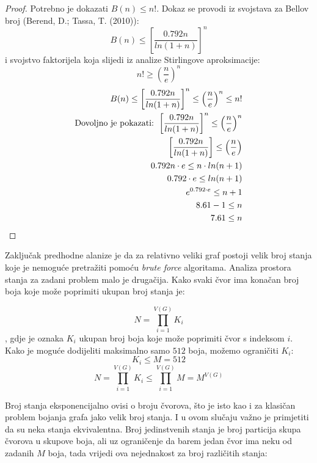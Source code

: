 \documentclass[times, utf8, diplomski, numeric]{fer}
\begin{document}
\begin{proof}
	Potrebno je dokazati $B(n) \le n!$. Dokaz se provodi iz svojstava za Bellov broj (Berend, D.; Tassa, T. (2010)): 
	\[ B(n) \le \left [ \frac{0.792 n}{ln(1+n)} \right ]^n \] 
	i svojstvo faktorijela koja slijedi iz analize Stirlingove aproksimacije: \[ n!\ge \left ( \frac{n}{e} \right )^n \]
	\begin{align}
		B(n) \le \left [ \frac{0.792 n}{ln(1+n)} \right ]^n \le \left ( \frac{n}{e} \right )^n \le n! \\
		\textup{Dovoljno je pokazati: } \left [ \frac{0.792 n}{ln(1+n)} \right ]^n \le \left ( \frac{n}{e} \right )^n \\
		\left [ \frac{0.792 n}{ln(1+n)} \right ] \le \left ( \frac{n}{e} \right ) \\
		0.792 n\cdot e \le n \cdot ln(n+1) \\
		0.792\cdot e \le ln(n+1) \\
		e^{0.792\cdot e} \le n+1 \\
		8.61 -1 \le n \\
		7.61 \le n
	\end{align}
\end{proof}

Zaključak predhodne alanize je da za relativno veliki graf postoji velik broj stanja koje je nemoguće pretražiti pomoću \emph{brute force} algoritama. Analiza prostora stanja za zadani problem malo je drugačija. Kako svaki čvor ima konačan broj boja koje može poprimiti ukupan broj stanja je:

\begin{equation}
N = \prod_{i=1}^{V(G)} K_i
\end{equation}
, gdje je oznaka $K_i$ ukupan broj boja koje može poprimiti čvor s indeksom $i$. Kako je moguće dodijeliti maksimalno samo $512$ boja, možemo ograničiti $K_i$:
\begin{equation}
K_i \le M = 512
\end{equation}
\begin{equation}
N = \prod_{i=1}^{V(G)} K_i \le \prod_{i=1}^{V(G)} M = M^{V(G)}
\end{equation}

Broj stanja eksponencijalno ovisi o broju čvorova, što je isto kao i za klasičan problem bojanja grafa jako velik broj stanja. I u ovom slučaju važno je primjetiti da su neka stanja ekvivalentna. Broj jedinstvenih stanja je broj particija skupa čvorova u skupove boja, ali uz ograničenje da barem jedan čvor ima neku od zadanih $M$ boja, tada vrijedi ova nejednakost za broj različitih stanja:
\end{document}
